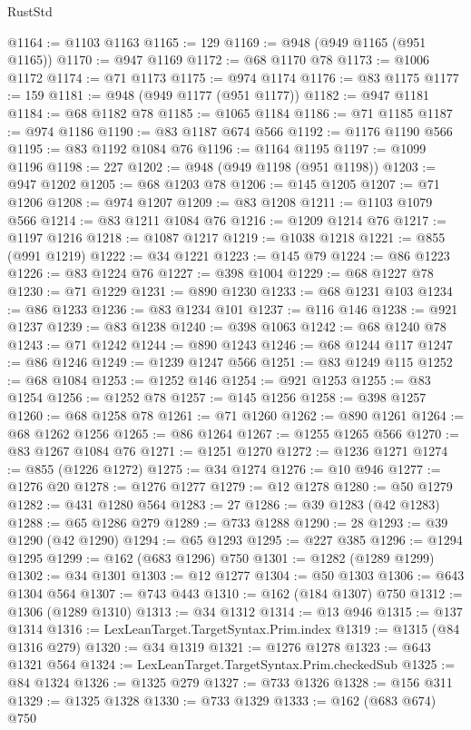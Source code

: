 \begin{lexlean}{RustStd}
\begin{coremodule}
{{@1164 := @1103 @1163
@1165 := 129
@1169 := @948 (@949 @1165 (@951 @1165))
@1170 := @947 @1169
@1172 := @68 @1170 @78
@1173 := @1006 @1172
@1174 := @71 @1173
@1175 := @974 @1174
@1176 := @83 @1175
@1177 := 159
@1181 := @948 (@949 @1177 (@951 @1177))
@1182 := @947 @1181
@1184 := @68 @1182 @78
@1185 := @1065 @1184
@1186 := @71 @1185
@1187 := @974 @1186
@1190 := @83 @1187 @674 @566
@1192 := @1176 @1190 @566
@1195 := @83 @1192 @1084 @76
@1196 := @1164 @1195
@1197 := @1099 @1196
@1198 := 227
@1202 := @948 (@949 @1198 (@951 @1198))
@1203 := @947 @1202
@1205 := @68 @1203 @78
@1206 := @145 @1205
@1207 := @71 @1206
@1208 := @974 @1207
@1209 := @83 @1208
@1211 := @1103 @1079 @566
@1214 := @83 @1211 @1084 @76
@1216 := @1209 @1214 @76
@1217 := @1197 @1216
@1218 := @1087 @1217
@1219 := @1038 @1218
@1221 := @855 (@991 @1219)
@1222 := @34 @1221
@1223 := @145 @79
@1224 := @86 @1223
@1226 := @83 @1224 @76
@1227 := @398 @1004
@1229 := @68 @1227 @78
@1230 := @71 @1229
@1231 := @890 @1230
@1233 := @68 @1231 @103
@1234 := @86 @1233
@1236 := @83 @1234 @101
@1237 := @116 @146
@1238 := @921 @1237
@1239 := @83 @1238
@1240 := @398 @1063
@1242 := @68 @1240 @78
@1243 := @71 @1242
@1244 := @890 @1243
@1246 := @68 @1244 @117
@1247 := @86 @1246
@1249 := @1239 @1247 @566
@1251 := @83 @1249 @115
@1252 := @68 @1084
@1253 := @1252 @146
@1254 := @921 @1253
@1255 := @83 @1254
@1256 := @1252 @78
@1257 := @145 @1256
@1258 := @398 @1257
@1260 := @68 @1258 @78
@1261 := @71 @1260
@1262 := @890 @1261
@1264 := @68 @1262 @1256
@1265 := @86 @1264
@1267 := @1255 @1265 @566
@1270 := @83 @1267 @1084 @76
@1271 := @1251 @1270
@1272 := @1236 @1271
@1274 := @855 (@1226 @1272)
@1275 := @34 @1274
@1276 := @10 @946
@1277 := @1276 @20
@1278 := @1276 @1277
@1279 := @12 @1278
@1280 := @50 @1279
@1282 := @431 @1280 @564
@1283 := 27
@1286 := @39 @1283 (@42 @1283)
@1288 := @65 @1286 @279
@1289 := @733 @1288
@1290 := 28
@1293 := @39 @1290 (@42 @1290)
@1294 := @65 @1293
@1295 := @227 @385
@1296 := @1294 @1295
@1299 := @162 (@683 @1296) @750
@1301 := @1282 (@1289 @1299)
@1302 := @34 @1301
@1303 := @12 @1277
@1304 := @50 @1303
@1306 := @643 @1304 @564
@1307 := @743 @443
@1310 := @162 (@184 @1307) @750
@1312 := @1306 (@1289 @1310)
@1313 := @34 @1312
@1314 := @13 @946
@1315 := @137 @1314
@1316 := LexLeanTarget.TargetSyntax.Prim.index
@1319 := @1315 (@84 @1316 @279)
@1320 := @34 @1319
@1321 := @1276 @1278
@1323 := @643 @1321 @564
@1324 := LexLeanTarget.TargetSyntax.Prim.checkedSub
@1325 := @84 @1324
@1326 := @1325 @279
@1327 := @733 @1326
@1328 := @156 @311
@1329 := @1325 @1328
@1330 := @733 @1329
@1333 := @162 (@683 @674) @750
}}
\end{coremodule}
\end{lexlean}
